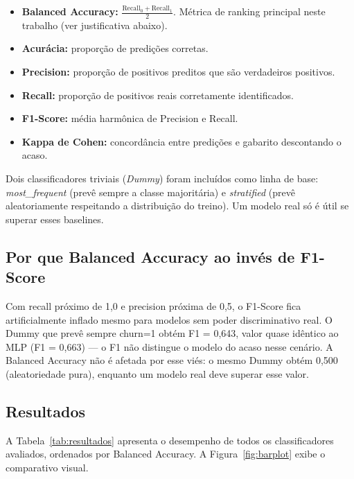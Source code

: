 \documentclass[12pt, a4paper]{article}
\begin{document}
\begin{itemize}
  \item \textbf{Balanced Accuracy:} $\frac{\text{Recall}_0 + \text{Recall}_1}{2}$.
        Métrica de ranking principal neste trabalho (ver justificativa abaixo).
  \item \textbf{Acurácia:} proporção de predições corretas.
  \item \textbf{Precision:} proporção de positivos preditos que são verdadeiros positivos.
  \item \textbf{Recall:} proporção de positivos reais corretamente identificados.
  \item \textbf{F1-Score:} média harmônica de Precision e Recall.
  \item \textbf{Kappa de Cohen:} concordância entre predições e gabarito descontando
        o acaso.
\end{itemize}

Dois classificadores triviais (\textit{Dummy}) foram incluídos como linha de base:
\textit{most\_frequent} (prevê sempre a classe majoritária) e \textit{stratified}
(prevê aleatoriamente respeitando a distribuição do treino). Um modelo real só é
útil se superar esses baselines.

\subsection{Por que Balanced Accuracy ao invés de F1-Score}

Com recall próximo de 1,0 e precision próxima de 0,5, o F1-Score fica artificialmente
inflado mesmo para modelos sem poder discriminativo real. O Dummy que prevê sempre
churn=1 obtém F1 = 0,643, valor quase idêntico ao MLP (F1 = 0,663) --- o F1 não
distingue o modelo do acaso nesse cenário. A Balanced Accuracy não é afetada por
esse viés: o mesmo Dummy obtém 0,500 (aleatoriedade pura), enquanto um modelo real
deve superar esse valor.

\subsection{Resultados}

A Tabela~\ref{tab:resultados} apresenta o desempenho de todos os classificadores
avaliados, ordenados por Balanced Accuracy. A Figura~\ref{fig:barplot} exibe o
comparativo visual.
\end{document}
